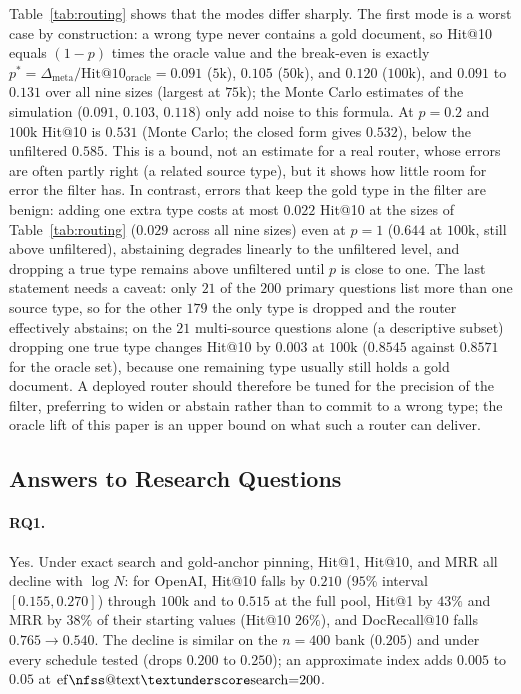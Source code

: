 \documentclass{ieeeaccess}
\makeatletter
\DeclareRobustCommand{\_}{\ifmmode\nfss@text{\textunderscore}\else\textunderscore\allowbreak\fi}
\makeatother
\begin{document}
Table~\ref{tab:routing} shows that the modes differ sharply. The first mode is a worst case by construction: a wrong type never contains a gold document, so Hit@10 equals $(1-p)$ times the oracle value and the break-even is exactly $p^\ast=\Delta_{\mathrm{meta}}/\mathrm{Hit@10}_{\mathrm{oracle}}=0.091$ ($5\text{k}$), $0.105$ ($50\text{k}$), and $0.120$ ($100\text{k}$), and $0.091$ to $0.131$ over all nine sizes (largest at $75\text{k}$); the Monte Carlo estimates of the simulation ($0.091$, $0.103$, $0.118$) only add noise to this formula. At $p{=}0.2$ and $100\text{k}$ Hit@10 is $0.531$ (Monte Carlo; the closed form gives $0.532$), below the unfiltered $0.585$. This is a bound, not an estimate for a real router, whose errors are often partly right (a related source type), but it shows how little room for error the filter has. In contrast, errors that keep the gold type in the filter are benign: adding one extra type costs at most $0.022$ Hit@10 at the sizes of Table~\ref{tab:routing} ($0.029$ across all nine sizes) even at $p{=}1$ ($0.644$ at $100\text{k}$, still above unfiltered), abstaining degrades linearly to the unfiltered level, and dropping a true type remains above unfiltered until $p$ is close to one. The last statement needs a caveat: only $21$ of the $200$ primary questions list more than one source type, so for the other $179$ the only type is dropped and the router effectively abstains; on the $21$ multi-source questions alone (a descriptive subset) dropping one true type changes Hit@10 by $0.003$ at $100\text{k}$ ($0.8545$ against $0.8571$ for the oracle set), because one remaining type usually still holds a gold document. A deployed router should therefore be tuned for the precision of the filter, preferring to widen or abstain rather than to commit to a wrong type; the oracle lift of this paper is an upper bound on what such a router can deliver.




\subsection{Answers to Research Questions}
\paragraph{RQ1.}
Yes. Under exact search and gold-anchor pinning, Hit@1, Hit@10, and MRR all decline with $\log N$: for OpenAI, Hit@10 falls by $0.210$ ($95\%$ interval $[0.155,0.270]$) through $100\text{k}$ and to $0.515$ at the full pool, Hit@1 by $43\%$ and MRR by $38\%$ of their starting values (Hit@10 $26\%$), and DocRecall@10 falls $0.765{\to}0.540$. The decline is similar on the $n{=}400$ bank ($0.205$) and under every schedule tested (drops $0.200$ to $0.250$); an approximate index adds $0.005$ to $0.05$ at $\mathrm{ef\_search}{=}200$.
\end{document}
